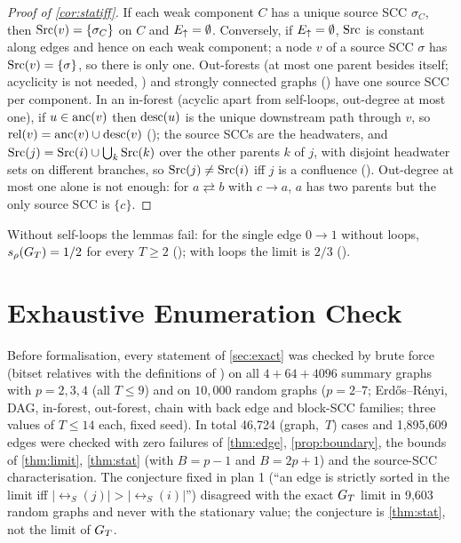 \begin{proof}[Proof of \cref{cor:statiff}]
If each weak component $C$ has a unique source SCC $\sigma_C$, then
$\mathrm{Src}(v)=\{\sigma_C\}$ on $C$ and $E_{\uparrow}=\emptyset$. Conversely, if
$E_{\uparrow}=\emptyset$, $\mathrm{Src}$ is constant along edges and hence on each weak
component; a node $v$ of a source SCC $\sigma$ has $\mathrm{Src}(v)=\{\sigma\}$, so
there is only one. Out-forests (at most one parent besides itself; acyclicity
is not needed, ) and strongly connected graphs
() have one source SCC per component. In an
in-forest (acyclic apart from self-loops, out-degree at most one), if
$u\in\mathrm{anc}(v)$ then $\mathrm{desc}(u)$ is the unique downstream path through $v$, so
$\mathrm{rel}(v)=\mathrm{anc}(v)\cup\mathrm{desc}(v)$ (); the source SCCs
are the headwaters, and $\mathrm{Src}(j)=\mathrm{Src}(i)\cup\bigcup_{k}\mathrm{Src}(k)$ over the other
parents $k$ of $j$, with disjoint headwater sets on different branches, so
$\mathrm{Src}(j)\ne\mathrm{Src}(i)$ iff $j$ is a confluence ().
Out-degree at most one alone is not enough: for $a\rightleftarrows b$ with
$c\to a$, $a$ has two parents but the only source SCC is $\{c\}$.
\end{proof}

\begin{remark}
Without self-loops the lemmas fail: for the single edge $0\to1$ without loops,
$s_\rho(G_T)=1/2$ for every $T\ge2$ (); with loops the
limit is $2/3$ ().
\end{remark}

\section{Exhaustive Enumeration Check}
\label{app:enum}

Before formalisation, every statement of \cref{sec:exact} was checked by
brute force (bitset relatives with the definitions of
\citealp{reisach2026topological}) on all $4+64+4096$ summary graphs with
$p=2,3,4$ (all $T\le9$) and on $10{,}000$ random graphs ($p=2$--$7$; Erd\H{o}s--R\'enyi,
DAG, in-forest, out-forest, chain with back edge and block-SCC families;
three values of $T\le14$ each, fixed seed). In total 46{,}724 (graph,~$T$)
cases and 1{,}895{,}609 edges were checked with zero failures of
\cref{thm:edge}, \cref{prop:boundary}, the bounds of \cref{thm:limit},
\cref{thm:stat} (with $B=p-1$ and $B=2p+1$) and the source-SCC
characterisation. The conjecture fixed in plan 1 (``an edge is strictly
sorted in the limit iff $|\rel_S(j)|>|\rel_S(i)|$'') disagreed with the exact
$G_T$ limit in 9{,}603 random graphs and never with the stationary value; the
conjecture is \cref{thm:stat}, not the limit of $G_T$.

